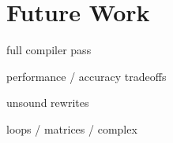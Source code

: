 \documentclass[paper.tex]{subfiles}
\begin{document}
\section{Future Work}
\label{sec:futurework}

full compiler pass

performance / accuracy tradeoffs

unsound rewrites

loops / matrices / complex
\end{document}
